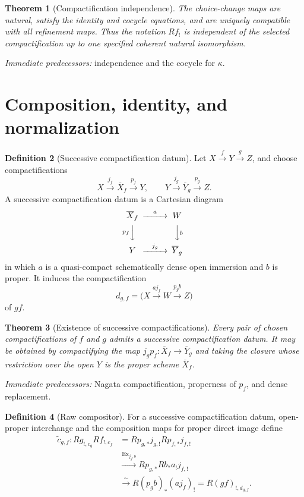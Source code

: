 \documentclass[10pt]{article}
\newtheorem{theorem}{Theorem}[section]
\theoremstyle{definition}
\newtheorem{definition}[theorem]{Definition}
\newcommand{\pred}[1]{\par\smallskip\begingroup\footnotesize\raggedright
\emph{Immediate predecessors:} #1.\par\endgroup}
\begin{document}
\begin{theorem}[Compactification independence]
The choice-change maps are natural, satisfy the identity and cocycle
equations, and are uniquely compatible with all refinement maps.  Thus the
notation \(Rf_!\) is independent of the selected compactification up to one
specified coherent natural isomorphism.
\end{theorem}
\pred{independence and the cocycle for \(\kappa\)}

\section{Composition, identity, and normalization}

\begin{definition}[Successive compactification datum]
Let \(X\xrightarrow{f}Y\xrightarrow{g}Z\), and choose compactifications
\[
 X\xrightarrow{j_f}\overline X_f\xrightarrow{p_f}Y,
 \qquad
 Y\xrightarrow{j_g}\overline Y_g\xrightarrow{p_g}Z.
\]
A successive compactification datum is a Cartesian diagram
\[
\begin{CD}
 \overline X_f@>{a}>>W\\
 @V{p_f}VV @VV{b}V\\
 Y@>{j_g}>>\overline Y_g
\end{CD}
\]
in which \(a\) is a quasi-compact schematically dense open immersion and
\(b\) is proper.  It induces the compactification
\[
 d_{g,f}=\bigl(X\xrightarrow{aj_f}W
 \xrightarrow{p_gb}Z\bigr)
\]
of \(gf\).
\end{definition}

\begin{theorem}[Existence of successive compactifications]
Every pair of chosen compactifications of \(f\) and \(g\) admits a
successive compactification datum.  It may be obtained by compactifying the
map \(j_gp_f:\overline X_f\to\overline Y_g\) and taking the closure whose
restriction over the open \(Y\) is the proper scheme \(\overline X_f\).
\end{theorem}
\pred{Nagata compactification, properness of \(p_f\), and dense replacement}

\begin{definition}[Raw compositor]
For a successive compactification datum, open-proper interchange and the
composition maps for proper direct image define
\[
 \begin{aligned}
 \widetilde c_{g,f}:Rg_{!,c_g}Rf_{!,c_f}
 &=Rp_{g,*}j_{g,!}Rp_{f,*}j_{f,!}\\
 &\xrightarrow{\operatorname{Ex}_{j_g,b}}
 Rp_{g,*}Rb_*a_!j_{f,!}\\
 &\xrightarrow{\sim}
 R(p_gb)_*(aj_f)_!=R(gf)_{!,d_{g,f}}.
 \end{aligned}
\]
\end{definition}
\end{document}
